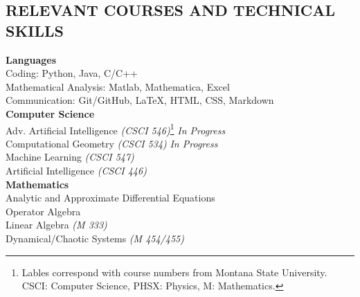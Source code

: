 \documentclass[margin]{res}
\begin{document}
\begin{resume}


\section{\uppercase{Relevant Courses and Technical \\Skills}}
{
\textbf{Languages}\\
	\hspace{3ex} Coding: Python, Java, C/C++\\
	\hspace{3ex} Mathematical Analysis: Matlab, Mathematica, Excel\\
	\hspace{3ex} Communication: Git/GitHub, LaTeX, HTML, CSS, Markdown\vspace*{1ex}\\
\textbf{Computer Science} \\
	\hspace{3ex} Adv. Artificial Intelligence \textit{(CSCI 546)}\footnote{Lables correspond with course numbers from Montana State University. CSCI: Computer Science, PHSX: Physics, M: Mathematics.} 
	\hfill \textit{In Progress}\\
	\hspace{3ex} Computational Geometry \textit{(CSCI 534)} 
	\hfill \textit{In Progress}\\
		\hspace{3ex} Machine Learning \textit{(CSCI 547)}\\
	\hspace{3ex} Artificial Intelligence \textit{(CSCI 446)}\vspace*{1ex}\\
\textbf{Mathematics}\\                                            
	\hspace{3ex} Analytic and Approximate Differential Equations\\
	\hspace{3ex} Operator Algebra\\
	\hspace{3ex} Linear Algebra \textit{(M 333)}\\
	\hspace{3ex} Dynamical/Chaotic Systems \textit{(M 454/455)}\\
}
\end{resume}
\end{document}
